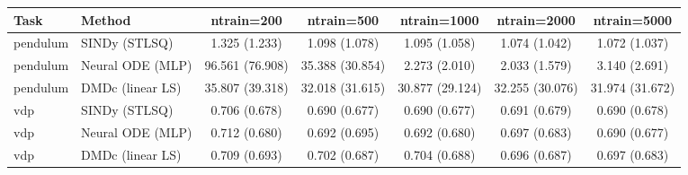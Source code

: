 \begin{tabular}{llccccc}\toprule
Task & Method & ntrain=200 & ntrain=500 & ntrain=1000 & ntrain=2000 & ntrain=5000 \\\midrule
pendulum & SINDy (STLSQ) & 1.325 (1.233) & 1.098 (1.078) & 1.095 (1.058) & 1.074 (1.042) & 1.072 (1.037) \\
pendulum & Neural ODE (MLP) & 96.561 (76.908) & 35.388 (30.854) & 2.273 (2.010) & 2.033 (1.579) & 3.140 (2.691) \\
pendulum & DMDc (linear LS) & 35.807 (39.318) & 32.018 (31.615) & 30.877 (29.124) & 32.255 (30.076) & 31.974 (31.672) \\
vdp & SINDy (STLSQ) & 0.706 (0.678) & 0.690 (0.677) & 0.690 (0.677) & 0.691 (0.679) & 0.690 (0.678) \\
vdp & Neural ODE (MLP) & 0.712 (0.680) & 0.692 (0.695) & 0.692 (0.680) & 0.697 (0.683) & 0.690 (0.677) \\
vdp & DMDc (linear LS) & 0.709 (0.693) & 0.702 (0.687) & 0.704 (0.688) & 0.696 (0.687) & 0.697 (0.683) \\
\bottomrule\end{tabular}
